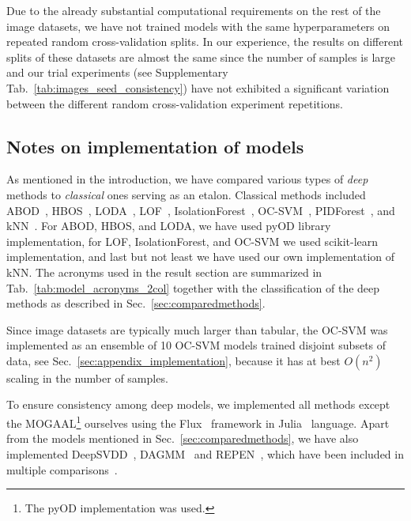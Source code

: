 Due to the already substantial computational requirements on the rest of the image datasets, we have not trained models with the same hyperparameters on repeated random cross-validation splits. In our experience, the results on different splits of these datasets are almost the same since the number of samples is large and our trial experiments (see Supplementary Tab.~\ref{tab:images_seed_consistency}) have not exhibited a significant variation between the different random cross-validation experiment repetitions. 


\subsection{Notes on implementation of models}
As mentioned in the introduction, we have compared various types of \textit{deep} methods to \emph{classical} ones serving as an etalon. Classical methods included ABOD~\cite{kriegel2008angle}, HBOS~\cite{goldstein2012histogram}, LODA~\cite{pevny2016loda}, LOF~\cite{breunig2000lof}, IsolationForest~\cite{liu2008isolation}, OC-SVM~\cite{scholkopf2001estimating}, PIDForest~\cite{gopalanPIDForestAnomalyDetection2019}, and kNN~\cite{ramaswamy2000efficient}. For ABOD, HBOS, and LODA, we have used pyOD library~\cite{zhao2019pyod} implementation, for LOF, IsolationForest, and OC-SVM we used scikit-learn~\cite{scikit-learn} implementation, and last but not least we have used our own implementation of kNN. The acronyms used in the result section are summarized in Tab.~\ref{tab:model_acronyms_2col} together with the classification of the deep methods as described in Sec.~\ref{sec:comparedmethods}.

Since image datasets are typically much larger than tabular, the OC-SVM was implemented as an ensemble of 10 OC-SVM models trained disjoint subsets of data, see Sec.~\ref{sec:appendix_implementation}, because it has at best $O(n^2)$ scaling in the number of samples. 

To ensure consistency among deep models, we implemented all methods except the MOGAAL\footnote{The pyOD implementation was used.} ourselves using the Flux~\cite{innes:2018} framework in Julia~\cite{Julia-2017} language. Apart from the models mentioned in Sec.~\ref{sec:comparedmethods}, we have also implemented DeepSVDD~\cite{ruff2018deep}, DAGMM~\cite{zong2018deep} and REPEN~\cite{pangLearningRepresentationsUltrahighdimensional2018}, which have been included in multiple comparisons~\cite{ruff2020unifying, wang2020advae, chalapathy2018anomaly}.

